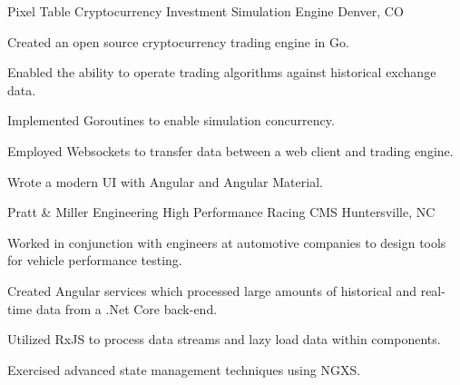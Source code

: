 

\begin{cventries}

    \cventry
    {Pixel Table} %
    {Cryptocurrency Investment Simulation Engine} %
    {Denver, CO} %
    {} %
    {
    \begin{cvitems} %
        \item {Created an open source cryptocurrency trading engine in Go.}
        \item {Enabled the ability to operate trading algorithms against historical exchange data.}
        \item {Implemented Goroutines to enable simulation concurrency.}
        \item {Employed Websockets to transfer data between a web client and trading engine.}
        \item {Wrote a modern UI with Angular and Angular Material.}
    \end{cvitems}
    }

    \cventry
    {Pratt \& Miller Engineering} %
    {High Performance Racing CMS} %
    {Huntersville, NC} %
    {} %
    {
    \begin{cvitems} %
        \item {Worked in conjunction with engineers at automotive companies to design tools for vehicle performance testing.}
        \item {Created Angular services which processed large amounts of historical and real-time data from a .Net Core back-end.}
        \item {Utilized RxJS to process data streams and lazy load data within components.}
        \item {Exercised advanced state management techniques using NGXS.}
    \end{cvitems}
    }


\end{cventries}
